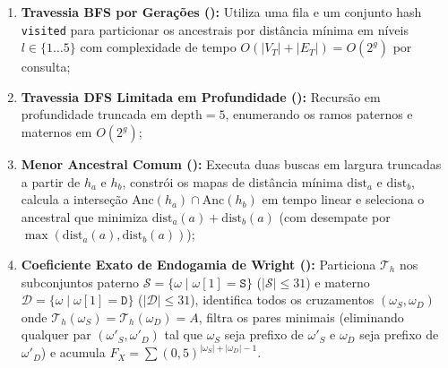 \documentclass[conference]{IEEEtran}
\begin{document}
\begin{enumerate}
    \item \textbf{Travessia BFS por Gerações ():} Utiliza uma fila  e um conjunto hash \texttt{visited} para particionar os ancestrais por distância mínima em níveis $l \in \{1 \dots 5\}$ com complexidade de tempo $O(|V_T| + |E_T|) = O(2^g)$ por consulta;
    \item \textbf{Travessia DFS Limitada em Profundidade ():} Recursão em profundidade truncada em $\text{depth} = 5$, enumerando os ramos paternos e maternos em $O(2^g)$;
    \item \textbf{Menor Ancestral Comum ():} Executa duas buscas em largura truncadas a partir de $h_a$ e $h_b$, constrói os mapas de distância mínima $\text{dist}_a$ e $\text{dist}_b$, calcula a interseção $\text{Anc}(h_a) \cap \text{Anc}(h_b)$ em tempo linear e seleciona o ancestral que minimiza $\text{dist}_a(a) + \text{dist}_b(a)$ (com desempate por $\max(\text{dist}_a(a), \text{dist}_b(a))$);
    \item \textbf{Coeficiente Exato de Endogamia de Wright ():} Particiona $\mathcal{T}_h$ nos subconjuntos paterno $\mathcal{S} = \{\omega \mid \omega[1] = \texttt{S}\}$ ($|\mathcal{S}| \le 31$) e materno $\mathcal{D} = \{\omega \mid \omega[1] = \texttt{D}\}$ ($|\mathcal{D}| \le 31$), identifica todos os cruzamentos $(\omega_S, \omega_D)$ onde $\mathcal{T}_h(\omega_S) = \mathcal{T}_h(\omega_D) = A$, filtra os pares minimais (eliminando qualquer par $(\omega'_S, \omega'_D)$ tal que $\omega_S$ seja prefixo de $\omega'_S$ e $\omega_D$ seja prefixo de $\omega'_D$) e acumula $F_X = \sum (0,5)^{|\omega_S| + |\omega_D| - 1}$.
\end{enumerate}
\end{document}
